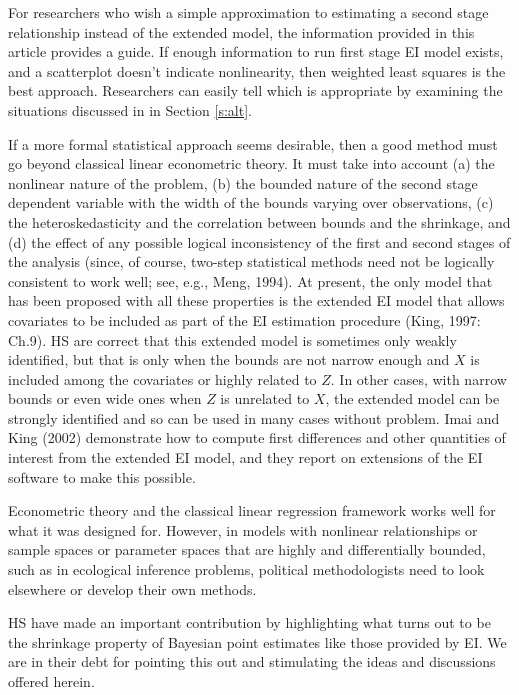 \documentclass[11pt,titlepage]{article}
\begin{document}
For researchers who wish a simple approximation to estimating a second
stage relationship instead of the extended model, the information
provided in this article provides a guide.  If enough information to
run first stage EI model exists, and a scatterplot doesn't indicate
nonlinearity, then weighted least squares is the best approach.
Researchers can easily tell which is appropriate by examining the
situations discussed in in Section \ref{s:alt}.

If a more formal statistical approach seems desirable, then a good
method must go beyond classical linear econometric theory.  It must
take into account (a) the nonlinear nature of the problem, (b) the
bounded nature of the second stage dependent variable with the width
of the bounds varying over observations, (c) the heteroskedasticity
and the correlation between bounds and the shrinkage, and (d) the
effect of any possible logical inconsistency of the first and second
stages of the analysis (since, of course, two-step statistical methods
need not be logically consistent to work well; see, e.g., Meng, 1994).
At present, the only model that has been proposed with all these
properties is the extended EI model that allows covariates to be
included as part of the EI estimation procedure (King, 1997: Ch.9).
HS are correct that this extended model is sometimes only weakly
identified, but that is only when the bounds are not narrow enough and
$X$ is included among the covariates or highly related to $Z$.  In
other cases, with narrow bounds or even wide ones when $Z$ is
unrelated to $X$, the extended model can be strongly identified and so
can be used in many cases without problem.  Imai and King (2002)
demonstrate how to compute first differences and other quantities of
interest from the extended EI model, and they report on extensions of
the EI software to make this possible.

Econometric theory and the classical linear regression framework works
well for what it was designed for.  However, in models with nonlinear
relationships or sample spaces or parameter spaces that are highly and
differentially bounded, such as in ecological inference problems,
political methodologists need to look elsewhere or develop their own
methods.  

HS have made an important contribution by highlighting what turns out
to be the shrinkage property of Bayesian point estimates like those
provided by EI.  We are in their debt for pointing this out and
stimulating the ideas and discussions offered herein.
\end{document}
